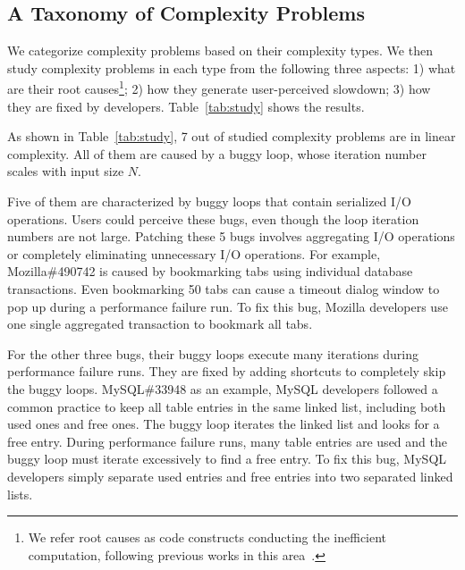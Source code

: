 \subsection{A Taxonomy of Complexity Problems}
\label{sec:tax}



We categorize complexity problems based on their complexity types.
We then study complexity problems in each type from the following three aspects:
1) what are their root causes\footnote{We refer root causes as code constructs 
conducting the inefficient computation, 
following previous works in this area~\cite{SongOOPSLA2014,ldoctor}.};
2) how they generate user-perceived slowdown;
3) how they are fixed by developers. 
Table~\ref{tab:study} shows the results. 

As shown in Table~\ref{tab:study}, 
7 out of \ComBugs studied complexity problems are in linear complexity. 
All of them are caused by a buggy loop, 
whose iteration number scales with input size $N$.

Five of them are characterized by buggy loops that contain serialized I/O operations.
Users could perceive these bugs, 
even though the loop iteration numbers are not large.
Patching these 5 bugs involves aggregating I/O operations 
or completely eliminating unnecessary I/O operations. 
For example, Mozilla\#490742 is caused by bookmarking 
tabs using individual database transactions. 
Even bookmarking 50 tabs can cause a timeout dialog 
window to pop up during a performance failure run. 
To fix this bug, Mozilla developers use one single aggregated transaction 
to bookmark all tabs.

For the other three bugs, 
their buggy loops execute many iterations during performance failure runs.
They are fixed by adding shortcuts to completely skip the buggy loops. 
MySQL\#33948 as an example,
MySQL developers followed a common practice to keep all table entries in the same linked list, 
including both used ones and free ones. 
The buggy loop iterates the linked list and looks for a free entry.
During performance failure runs, 
many table entries are used and the buggy loop must iterate excessively to find a free entry.
To fix this bug, MySQL developers simply separate used entries and free entries 
into two separated linked lists. 


